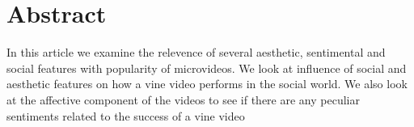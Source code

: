 \section{Abstract}
In this article we examine the relevence of several aesthetic, sentimental and social features with popularity of microvideos. We look at influence of social and aesthetic features on how a vine video performs in the social world. We also look at the affective component of the videos to see if there are any peculiar sentiments related to the success of a vine video 
